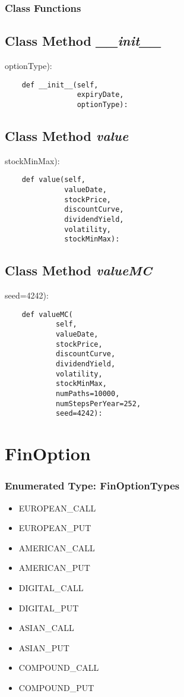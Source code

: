 \documentclass[twoside,11pt]{book}
\begin{document}
\subsubsection{Class Functions}

\subsection{Class Method {\it \_\_init\_\_}}
optionType):

\begin{lstlisting}
    def __init__(self,
                 expiryDate,
                 optionType):
\end{lstlisting}

\subsection{Class Method {\it value}}
stockMinMax):

\begin{lstlisting}
    def value(self,
              valueDate,
              stockPrice,
              discountCurve,
              dividendYield,
              volatility,
              stockMinMax):
\end{lstlisting}

\subsection{Class Method {\it valueMC}}
seed=4242):

\begin{lstlisting}
    def valueMC(
            self,
            valueDate,
            stockPrice,
            discountCurve,
            dividendYield,
            volatility,
            stockMinMax,
            numPaths=10000,
            numStepsPerYear=252,
            seed=4242):
\end{lstlisting}

\newpage
\section{FinOption}

\subsubsection{Enumerated Type: FinOptionTypes}
\begin{itemize}
\item{EUROPEAN\_CALL}
\item{EUROPEAN\_PUT}
\item{AMERICAN\_CALL}
\item{AMERICAN\_PUT}
\item{DIGITAL\_CALL}
\item{DIGITAL\_PUT}
\item{ASIAN\_CALL}
\item{ASIAN\_PUT}
\item{COMPOUND\_CALL}
\item{COMPOUND\_PUT}
\end{itemize}
\end{document}
